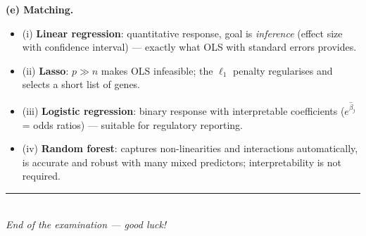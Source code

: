 \documentclass[11pt,a4paper]{article}
\begin{document}
\begin{solutionbox}
\medskip
\textbf{(e) Matching.}
\begin{itemize}[nosep,leftmargin=5mm]
  \item (i) \textbf{Linear regression}: quantitative response, goal is \emph{inference}
    (effect size with confidence interval) --- exactly what OLS with standard errors provides.
  \item (ii) \textbf{Lasso}: $p\gg n$ makes OLS infeasible; the $\ell_1$ penalty regularises
    and selects a short list of genes.
  \item (iii) \textbf{Logistic regression}: binary response with interpretable coefficients
    ($e^{\hat\beta_j}$ = odds ratios) --- suitable for regulatory reporting.
  \item (iv) \textbf{Random forest}: captures non-linearities and interactions automatically,
    is accurate and robust with many mixed predictors; interpretability is not required.
\end{itemize}
\end{solutionbox}
\fi

\vspace{6mm}
\begin{center}
\rule{0.35\textwidth}{0.4pt}\\[1mm]
\textit{End of the examination --- good luck!}
\end{center}
\end{document}
